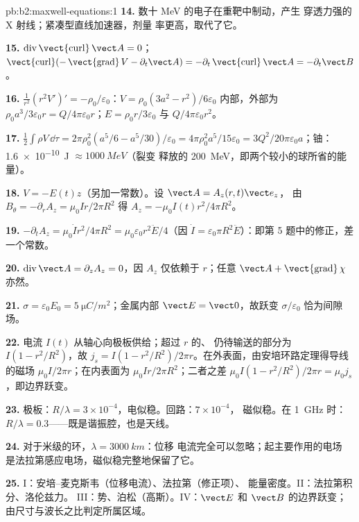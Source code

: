 \begin{solution}{pb:b2:maxwell-equations:1}
\textbf{14.} 数十 MeV 的电子在重靶中制动，产生
穿透力强的 X 射线；紧凑型直线加速器，剂量
率更高，取代了它。

\textbf{15.} $\operatorname{div}\operatorname{\vect{curl}}\vect A = 0$；$\operatorname{\vect{curl}}(-\operatorname{\vect{grad}}
V - \partial_t\vect A) = -\partial_t\operatorname{\vect{curl}}\vect A = -\partial_t\vect B$。

\textbf{16.} $\frac1{r^2}(r^2V')' = -\rho_0/\varepsilon_0$：$V = \rho_0(3a^2 - r^2)/6\varepsilon_0$
内部，外部为 $\rho_0a^3/3\varepsilon_0r = Q/4\pi\varepsilon_0r$；$E = \rho_0r/3\varepsilon_0$ 与
$Q/4\pi\varepsilon_0r^2$。

\textbf{17.} $\tfrac12\int\rho V\,\dd\tau = 2\pi\rho_0^2(a^5/6 - a^5/30)/\varepsilon_0 = 4\pi\rho_0^2a^5/
15\varepsilon_0 = 3Q^2/20\pi\varepsilon_0a$；铀：\qty{1.6e-10}{J} $\approx \qty{1000}{MeV}$（裂变
释放的 \qty{200}{MeV}，即两个较小的球所省的能量）。

\textbf{18.} $V = -E(t)z$（另加一常数）。设 $\vect A = A_z(r, t)\vect e_z$，
由 $B_\theta = -\partial_rA_z = \mu_0Ir/2\pi R^2$ 得 $A_z = -\mu_0I(t)r^2/4\pi R^2$。

\textbf{19.} $-\partial_tA_z = \mu_0\dot Ir^2/4\pi R^2 = \mu_0\varepsilon_0r^2\ddot E/4$（因 $\dot I =
\varepsilon_0\pi R^2\ddot E$）：即第 5 题中的修正，差一个常数。

\textbf{20.} $\operatorname{div}\vect A = \partial_zA_z = 0$，因 $A_z$
仅依赖于 $r$；任意 $\vect A + \operatorname{\vect{grad}}\chi$ 亦然。

\textbf{21.} $\sigma = \varepsilon_0E_0 = \qty{5}{\micro C/m^2}$；金属内部 $\vect E =
\vect 0$，故跃变 $\sigma/\varepsilon_0$ 恰为间隙场。

\textbf{22.} 电流 $I(t)$ 从轴心向极板供给；超过 $r$ 的、
仍待输送的部分为 $I(1 - r^2/R^2)$，故 $j_s = I(1 -
r^2/R^2)/2\pi r$。在外表面，由安培环路定理得导线的磁场 $\mu_0I/
2\pi r$；在内表面为 $\mu_0Ir/2\pi R^2$；二者之差 $\mu_0I(1 -
r^2/R^2)/2\pi r = \mu_0j_s$，即边界跃变。

\textbf{23.} 极板：$R/\lambda = 3 \times 10^{-4}$，电似稳。回路：$7 \times 10^{-4}$，
磁似稳。在 \qty{1}{GHz} 时：$R/\lambda = 0.3$——既是谐振腔，也是天线。

\textbf{24.} 对于米级的环，$\lambda = \qty{3000}{km}$：位移
电流完全可以忽略；起主要作用的电场
是法拉第感应电场，磁似稳完整地保留了它。

\textbf{25.} I：安培–麦克斯韦（位移电流）、法拉第（修正项）、
能量密度。II：法拉第积分、洛伦兹力。
III：势、泊松（高斯）。IV：$\vect E$
和 $\vect B$ 的边界跃变；由尺寸与波长之比判定所属区域。
\end{solution}
